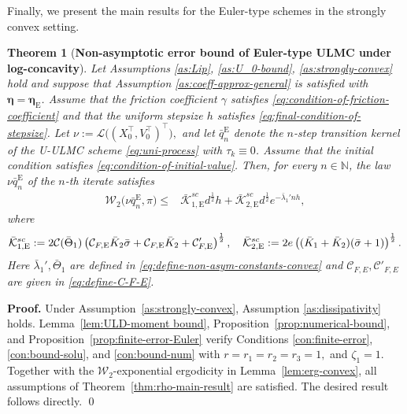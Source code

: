 \documentclass[12pt]{article}
\newenvironment{redtext}
  {\color{black}\ignorespaces}
  {\ignorespacesafterend}
\numberwithin{equation}{section}
\renewenvironment{proof}%
  {\begin{trivlist}%
   \item[]\ignorespaces}%
  {\qed\end{trivlist}}
\newtheorem{thm}{Theorem}[section]
\begin{document}
\begin{redtext}

Finally, we present the main results for the Euler-type schemes in the strongly convex setting.

\begin{thm}[\textbf{Non-asymptotic error bound of Euler-type ULMC under log-concavity}]
\label{thm:convex-main-result-Euler}
Let Assumptions \ref{as:Lip}, \ref{as:U_0-bound},
\ref{as:strongly-convex} hold and suppose that Assumption \ref{as:coeff-approx-general} is satisfied with $\boldsymbol{\eta}=\boldsymbol{\eta}_\mathrm{E}$.
Assume that the friction coefficient $\gamma$ satisfies
\eqref{eq:condition-of-friction-coefficient} and that the uniform
stepsize $h$ satisfies \eqref{eq:final-condition-of-stepsize}.
Let
\(
\nu
:=
\mathcal L
\big(
(X_0^\top,V_0^\top)^\top
\big),
\)
and let $\bar q^{\mathrm E}_{n}$ denote the $n$-step transition kernel of the U-ULMC scheme \eqref{eq:uni-process} with $\tau_k\equiv0$.
Assume that the initial condition satisfies
\eqref{eq:condition-of-initial-value}.
Then, for every $n\in\mathbb N$, the law $\nu \bar q^{\mathrm E}_{n}$ of the $n$-th iterate satisfies
\begin{align}
\mathcal W_2
\big(
\nu\bar q^{\mathrm E}_{n},
\pi
\big)
\leq&
\bar{\mathcal K}_{1,\mathrm{E}}^{sc}
d^{\frac12}h
+
\bar{\mathcal K}_{2,\mathrm{E}}^{sc}
d^{\frac12}
e^{-\bar\lambda_1'nh},
\label{eq:convex-main-result-Euler}
\end{align}
where
\begin{align}
\bar{\mathcal K}_{1,\mathrm{E}}^{sc}
:={}
2
\mathcal C(\bar\Theta_1)
\left(
\mathcal C_{F,\rm E}\bar K_2\bar\sigma
+
\mathcal C_{F,\rm E}\bar K_2
+
\mathcal C_{F,\rm E}'
\right)^{\frac12},
\quad
\bar{\mathcal K}_{2,\mathrm{E}}^{sc}
:={}
2e
\left(
(\bar K_1+\bar K_2)
(\bar\sigma+1)
\right)^{\frac12}.
\label{eq:constants-main-result-Euler-sc}
\end{align}
Here $\bar\lambda_1',\bar\Theta_1$ are defined in
\eqref{eq:define-non-asym-constants-convex} and $\mathcal C_{F,E},\mathcal C'_{F,E}$ are given in \eqref{eq:define-C-F-E}.
\end{thm}

\begin{proof}
\textbf{Proof.}
Under Assumption~\ref{as:strongly-convex}, Assumption
\ref{as:dissipativity} holds.
Lemma~\ref{lem:ULD-moment bound},
Proposition~\ref{prop:numerical-bound}, and
Proposition~\ref{prop:finite-error-Euler} verify
Conditions \ref{con:finite-error}, \ref{con:bound-solu}, and
\ref{con:bound-num} with
$
r=r_1=r_2=r_3=1,
$
and
$
\zeta_1=1.
$
Together with the $\mathcal W_2$-exponential ergodicity in
Lemma~\ref{lem:erg-convex}, all assumptions of
Theorem~\ref{thm:rho-main-result} are satisfied.
The desired result follows directly.
\end{proof}


\end{redtext}
\end{document}
